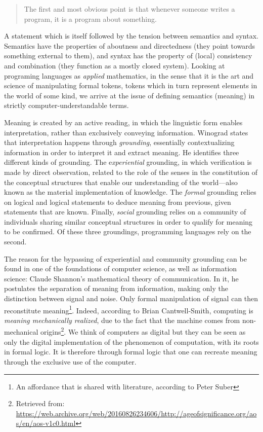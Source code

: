 \begin{quote}
  The first and most obvious point is that whenever someone writes a program, it is a program about something.\citep{winograd_language_1982}
\end{quote}

A statement which is itself followed by the tension between semantics and syntax. Semantics have the properties of aboutness and directedness (they point towards something external to them), and syntax has the property of (local) consistency and combination (they function as a mostly closed system). Looking at programing languages as \emph{applied} mathematics, in the sense that it is the art and science of manipulating formal tokens, tokens which in turn represent elements in the world of some kind, we arrive at the issue of defining semantics (meaning) in strictly computer-understandable terms.

Meaning is created by an active reading, in which the linguistic form enables interpretation, rather than exclusively conveying information. Winograd states that interpretation happens through \emph{grounding}, essentially contextualizing information in order to interpret it and extract meaning. He identifies three different kinds of grounding. The e\emph{xperiential} grounding, in which verification is made by direct observation, related to the role of the senses in the constitution of the conceptual structures that enable our understanding of the world—also known as the material implementation of knowledge. The \emph{formal} grounding relies on logical and logical statements to deduce meaning from previous, given statements that are known. Finally, \emph{social} grounding relies on a community of individuals sharing similar conceptual structures in order to qualify for meaning to be confirmed. Of these three groundings, programming languages rely on the second.

The reason for the bypassing of experiential and community grounding can be found in one of the foundations of computer science, as well as information science: Claude Shannon's mathematical theory of communication. In it, he postulates the separation of meaning from information, making only the distinction between signal and noise. Only formal manipulation of signal can then reconstitute meaning\footnote{An affordance that is shared with literature, according to Peter Suber\citep{suber_what_1988}}. Indeed, according to Brian Cantwell-Smith, computing is \emph{meaning mechanically realized}, due to the fact that the machine comes from non-mechanical origins\footnote{Retrieved from: \url{https://web.archive.org/web/20160826234606/http://ageofsignificance.org/aos/en/aos-v1c0.html}}. We think of computers as digital but they can be seen as only the digital implementation of the phenomenon of computation, with its roots in formal logic. It is therefore through formal logic that one can recreate meaning through the exclusive use of the computer.

